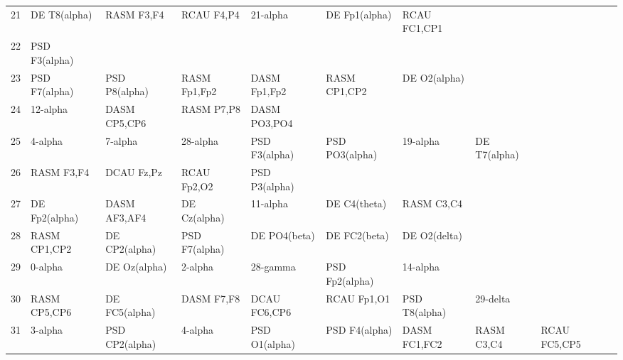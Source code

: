 \begin{landscape}
\begin{table}[]
\begin{tabular}{l|llllllll}
21       & DE T8(alpha)   & RASM F3,F4     & RCAU F4,P4     & 21-alpha       & DE Fp1(alpha)  & RCAU FC1,CP1   &               &                &               &               \\
22       & PSD F3(alpha)  &                &                &                &                &                &               &                &               &               \\
23       & PSD F7(alpha)  & PSD P8(alpha)  & RASM Fp1,Fp2   & DASM Fp1,Fp2   & RASM CP1,CP2   & DE O2(alpha)   &               &                &               &               \\
24       & 12-alpha       & DASM CP5,CP6   & RASM P7,P8     & DASM PO3,PO4   &                &                &               &                &               &               \\
25       & 4-alpha        & 7-alpha        & 28-alpha       & PSD F3(alpha)  & PSD PO3(alpha) & 19-alpha       & DE T7(alpha)  &                &               &               \\
26       & RASM F3,F4     & DCAU Fz,Pz     & RCAU Fp2,O2    & PSD P3(alpha)  &                &                &               &                &               &               \\
27       & DE Fp2(alpha)  & DASM AF3,AF4   & DE Cz(alpha)   & 11-alpha       & DE C4(theta)   & RASM C3,C4     &               &                &               &               \\
28       & RASM CP1,CP2   & DE CP2(alpha)  & PSD F7(alpha)  & DE PO4(beta)   & DE FC2(beta)   & DE O2(delta)   &               &                &               &               \\
29       & 0-alpha        & DE Oz(alpha)   & 2-alpha        & 28-gamma       & PSD Fp2(alpha) & 14-alpha       &               &                &               &               \\
30       & RASM CP5,CP6   & DE FC5(alpha)  & DASM F7,F8     & DCAU FC6,CP6   & RCAU Fp1,O1    & PSD T8(alpha)  & 29-delta      &                &               &               \\
31       & 3-alpha        & PSD CP2(alpha) & 4-alpha        & PSD O1(alpha)  & PSD F4(alpha)  & DASM FC1,FC2   & RASM C3,C4    & RCAU FC5,CP5   &               &               \\
\end{tabular}
\end{table}
\end{landscape}
\clearpage
